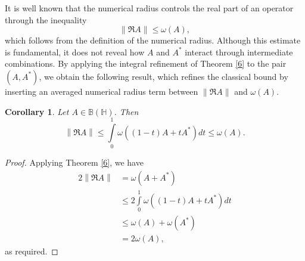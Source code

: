 \documentclass[12pt,twoside,reqno]{amsart}
\newtheorem{corollary}{Corollary}[section]
\numberwithin{equation}{section}
\begin{document}

It is well known that the numerical radius controls the real part of an operator through the inequality
\[
\|\Re A\|\le \omega(A),
\]
which follows from the definition of the numerical radius. Although this estimate is fundamental, it does not reveal how $A$ and $A^*$ interact through intermediate combinations. By applying the integral refinement of Theorem \ref{6} to the pair $(A,A^*)$, we obtain the following result, which refines the classical bound by inserting an averaged numerical radius term between $\|\Re A\|$ and $\omega(A)$.

\begin{corollary}\label{3}
Let $A\in \mathbb B\left( \mathbb H \right)$. Then
\[\left\| \Re A \right\|\le \int\limits_{0}^{1}{\omega \left( \left( 1-t \right)A+t{{A}^{*}} \right)dt}\le \omega \left( A \right).\]
\end{corollary}
\begin{proof}
Applying Theorem \ref{6}, we have
\[\begin{aligned}
   2\left\| \Re A \right\|&=\omega \left( A+{{A}^{*}} \right) \\ 
 & \le 2\int\limits_{0}^{1}{\omega \left( \left( 1-t \right)A+t{{A}^{*}} \right)dt} \\ 
 & \le \omega \left( A \right)+\omega \left( {{A}^{*}} \right) \\ 
 & =2\omega \left( A \right),  
\end{aligned}\]
as required.
\end{proof}
\end{document}
